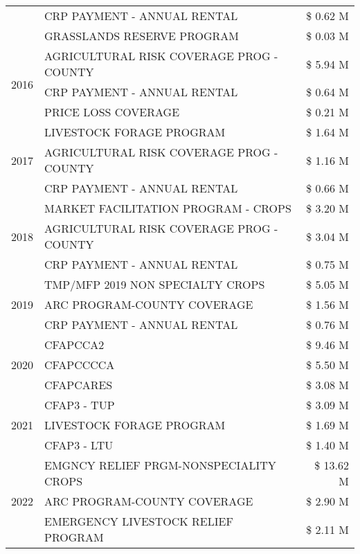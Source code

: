\begin{tabular}{llr}
 & CRP PAYMENT - ANNUAL RENTAL & \$ 0.62 M \\
 & GRASSLANDS RESERVE PROGRAM & \$ 0.03 M \\
\cline{1-3}
\multirow[t]{3}{*}{2016} & AGRICULTURAL RISK COVERAGE PROG - COUNTY & \$ 5.94 M \\
 & CRP PAYMENT - ANNUAL RENTAL & \$ 0.64 M \\
 & PRICE LOSS COVERAGE & \$ 0.21 M \\
\cline{1-3}
\multirow[t]{3}{*}{2017} & LIVESTOCK FORAGE PROGRAM & \$ 1.64 M \\
 & AGRICULTURAL RISK COVERAGE PROG - COUNTY & \$ 1.16 M \\
 & CRP PAYMENT - ANNUAL RENTAL & \$ 0.66 M \\
\cline{1-3}
\multirow[t]{3}{*}{2018} & MARKET FACILITATION PROGRAM - CROPS & \$ 3.20 M \\
 & AGRICULTURAL RISK COVERAGE PROG - COUNTY & \$ 3.04 M \\
 & CRP PAYMENT - ANNUAL RENTAL & \$ 0.75 M \\
\cline{1-3}
\multirow[t]{3}{*}{2019} & TMP/MFP 2019 NON SPECIALTY CROPS & \$ 5.05 M \\
 & ARC PROGRAM-COUNTY COVERAGE & \$ 1.56 M \\
 & CRP PAYMENT - ANNUAL RENTAL & \$ 0.76 M \\
\cline{1-3}
\multirow[t]{3}{*}{2020} & CFAPCCA2 & \$ 9.46 M \\
 & CFAPCCCCA & \$ 5.50 M \\
 & CFAPCARES & \$ 3.08 M \\
\cline{1-3}
\multirow[t]{3}{*}{2021} & CFAP3 - TUP & \$ 3.09 M \\
 & LIVESTOCK FORAGE PROGRAM & \$ 1.69 M \\
 & CFAP3 - LTU & \$ 1.40 M \\
\cline{1-3}
\multirow[t]{3}{*}{2022} & EMGNCY RELIEF PRGM-NONSPECIALITY CROPS & \$ 13.62 M \\
 & ARC PROGRAM-COUNTY COVERAGE & \$ 2.90 M \\
 & EMERGENCY LIVESTOCK RELIEF PROGRAM & \$ 2.11 M \\
\cline{1-3}
\bottomrule
\end{tabular}
